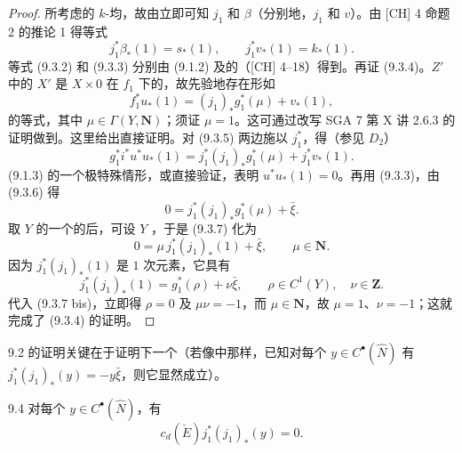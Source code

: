 \begin{proof}
所考虑的 $k$-均，故由立即可知 $j_1$ 和 $\beta$（分别地，$j_1$ 和 $v$）。由 [CH] 4 命题 2 的推论 1 得等式
\[
 j_1^*\beta_*(1)=s_*(1),\qquad j_1^*v_*(1)=k_*(1).
\]
等式 (9.3.2) 和 (9.3.3) 分别由 (9.1.2) 及的（[CH] 4--18）得到。再证 (9.3.4)。$Z'$ 中的 $X'$ 是 $X\times0$ 在 $f_1$ 下的，故先验地存在形如
\[
 f_1^*u_*(1)=(j_1)_*g_1^*(\mu)+v_*(1),\tag{9.3.5}
\]
的等式，其中 $\mu\in\Gamma(Y,\mathbf N)$；须证 $\mu=1$。这可通过改写 SGA 7 第 X 讲 2.6.3 的证明做到。这里给出直接证明。对 (9.3.5) 两边施以 $j_1^*$，得（参见 $D_2$）
\[
 g_1^*i^*u^*u_*(1)=j_1^*(j_1)_*g_1^*(\mu)+j_1^*v_*(1).\tag{9.3.6}
\]
(9.1.3) 的一个极特殊情形，或直接验证，表明 $u^*u_*(1)=0$。再用 (9.3.3)，由 (9.3.6) 得
\[
 0=j_1^*(j_1)_*g_1^*(\mu)+\bar\xi.\tag{9.3.7}
\]
取 $Y$ 的一个的后，可设 $Y$ ，于是 (9.3.7) 化为
\[
 0=\mu\,j_1^*(j_1)_*(1)+\bar\xi,\qquad\mu\in\mathbf N.\tag{9.3.7 bis}
\]
因为 $j_1^*(j_1)_*(1)$ 是 $1$ 次元素，它具有
\[
 j_1^*(j_1)_*(1)=g_1^*(\rho)+\nu\bar\xi,
 \qquad\rho\in C^1(Y),\quad\nu\in\mathbf Z.
\]
代入 (9.3.7 bis)，立即得 $\rho=0$ 及 $\mu\nu=-1$，而 $\mu\in\mathbf N$，故 $\mu=1$、$\nu=-1$；这就完成了 (9.3.4) 的证明。
\end{proof}
9.2 的证明关键在于证明下一个（若像中那样，已知对每个 $y\in C^\bullet(\widehat N)$ 有 $j_1^*(j_1)_*(y)=-y\bar\xi$，则它显然成立）。
\begin{SGAresult}{}{9.4}
对每个 $y\in C^\bullet(\widehat N)$，有
\[
 c_d(\check E)j_1^*(j_1)_*(y)=0.
\]
\end{SGAresult}
